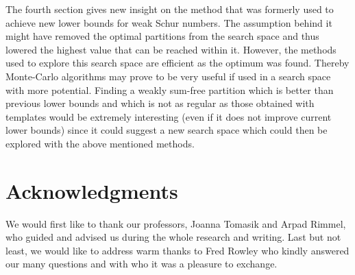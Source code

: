 \documentclass{article}
\newtheorem{computational theorem}{Computational Theorem}[section]
\begin{document}
\par
The fourth section gives new insight on the method that was formerly used to achieve new lower bounds for weak 
Schur numbers. The assumption behind it might have removed the optimal partitions from the search space and thus 
lowered the highest value that can be reached within it. However, the methods used to explore this search space 
are efficient as the optimum was found. Thereby Monte-Carlo algorithms may prove to be very useful if used in a 
search space with more potential. Finding a weakly sum-free partition which is better than previous lower bounds 
and which is not as regular as those obtained with templates would be extremely interesting (even if it does not 
improve current lower bounds) since it could suggest a new search space which could then be explored with the 
above mentioned methods.


\section{Acknowledgments}

\qquad We would first like to thank our professors, Joanna Tomasik and Arpad Rimmel, who guided and advised
us during the whole research and writing. Last but not least, we would like to address warm thanks
to Fred Rowley who kindly answered our many questions and with who it was a pleasure to exchange.






\end{document}
